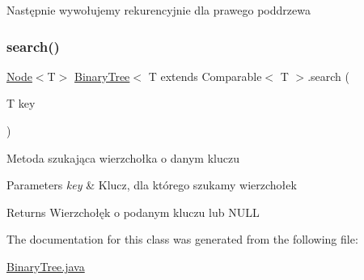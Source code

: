 Następnie wywołujemy rekurencyjnie dla prawego poddrzewa \mbox{\label{classBinaryTree_aa5345ff34f14685521f16e82d8ccf92b}} 
\subsubsection{\texorpdfstring{search()}{search()}}
{\footnotesize\ttfamily \hyperlink{classNode}{Node}$<$T$>$ \hyperlink{classBinaryTree}{Binary\+Tree}$<$ T extends Comparable$<$ T $>$.search (\begin{DoxyParamCaption}\item[{T}]{key }\end{DoxyParamCaption})\hspace{0.3cm}{\ttfamily [inline]}}

Metoda szukająca wierzchołka o danym kluczu 
\begin{DoxyParams}{Parameters}
{\em key} & Klucz, dla którego szukamy wierzchołek \\
\hline
\end{DoxyParams}
\begin{DoxyReturn}{Returns}
Wierzchołęk o podanym kluczu lub N\+U\+LL 
\end{DoxyReturn}


The documentation for this class was generated from the following file\+:\begin{DoxyCompactItemize}
\item 
\hyperlink{BinaryTree_8java}{Binary\+Tree.\+java}\end{DoxyCompactItemize}
